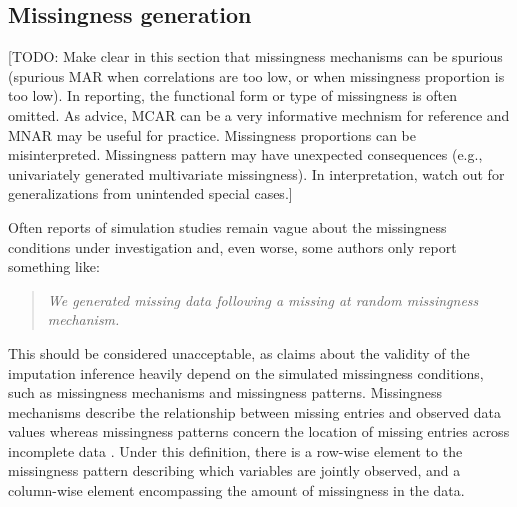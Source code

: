 \documentclass[bimj,fleqn]{w-art}
\begin{document}




\subsection{Missingness generation}

[TODO: Make clear in this section that missingness mechanisms can be spurious (spurious MAR when correlations are too low, or when missingness proportion is too low). In reporting, the functional form or type of missingness is often omitted. As advice, MCAR can be a very informative mechnism for reference and MNAR may be useful for practice. Missingness proportions can be misinterpreted. Missingness pattern may have unexpected consequences (e.g., univariately generated multivariate missingness). In interpretation, watch out for generalizations from unintended special cases.]


Often reports of simulation studies remain vague about the missingness conditions under investigation and, even worse, some authors only report something like:
\begin{quote}
\textit{We generated missing data following a missing at random missingness mechanism.}
\end{quote}
This should be considered unacceptable, as claims about the validity of the imputation inference heavily depend on the simulated missingness conditions, such as missingness mechanisms and missingness patterns. Missingness mechanisms describe the relationship between missing entries and observed data values whereas missingness patterns concern the location of missing entries across incomplete data \citep[][p. 8]{litt20}. Under this definition, there is a row-wise element to the missingness pattern describing which variables are jointly observed, and a column-wise element encompassing the amount of missingness in the data. 
\end{document}
